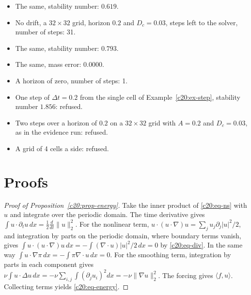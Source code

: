 \begin{mdframed}[linecolor=gray!60,backgroundcolor=gray!5]
\begin{itemize}
\item The same, stability number: $0.619$.
\item No drift, a $32\times32$ grid, horizon $0.2$ and $D_c=0.03$, steps left to the solver, number of steps: 31.
\item The same, stability number: $0.793$.
\item The same, mass error: $0.0000$.
\item A horizon of zero, number of steps: 1.
\item One step of $\Delta t=0.2$ from the single cell of Example~\ref{c20:ex-step}, stability number $1.856$: refused.
\item Two steps over a horizon of $0.2$ on a $32\times32$ grid with $A=0.2$ and $D_c=0.03$, as in the evidence run: refused.
\item A grid of 4 cells a side: refused.
\end{itemize}
\end{mdframed}

\section{Proofs}

\begin{proof}[Proof of Proposition~\ref{c20:prop-energy}]
Take the inner product of \eqref{c20:eq-ns} with $u$ and integrate over the periodic domain. The time derivative gives $\int u\cdot\partial_tu\,dx=\tfrac12\tfrac d{dt}\|u\|_2^2$. For the nonlinear term,
$u\cdot(u\cdot\nabla)u=\sum_ju_j\partial_j|u|^2/2$, and integration by parts on the periodic domain, where
boundary terms vanish, gives $\int u\cdot(u\cdot\nabla)u\,dx=-\int(\nabla\cdot u)|u|^2/2\,dx=0$ by \eqref{c20:eq-div}. In the
same way $\int u\cdot\nabla\pi\,dx=-\int\pi\nabla\cdot u\,dx=0$. For the smoothing term, integration by parts
in each component gives $\nu\int u\cdot\Delta u\,dx=-\nu\sum_{i,j}\int(\partial_ju_i)^2dx=-\nu\|\nabla u\|_2^2$. The forcing gives
$\langle f,u\rangle$. Collecting terms yields \eqref{c20:eq-energy}.
\end{proof}

